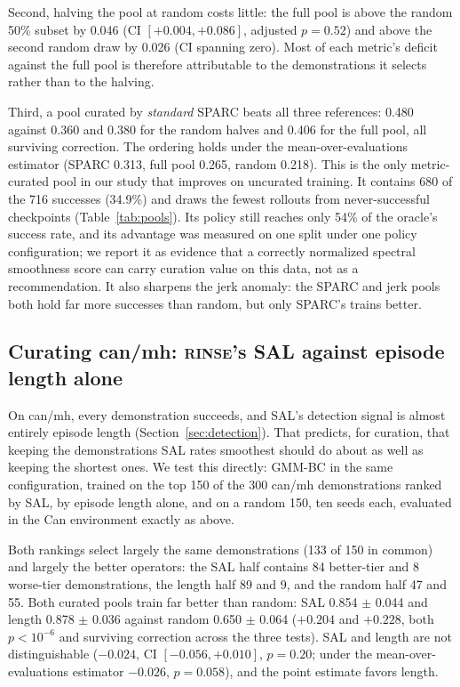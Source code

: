 \documentclass[10pt]{article}
\newcommand{\rinse}{\textmd{\textsc{rinse}}}
\begin{document}
Second, halving the pool at random costs little: the full pool is above the
random 50\% subset by 0.046 (CI $[+0.004, +0.086]$, adjusted $p = 0.52$) and
above the second random draw by 0.026 (CI spanning zero). Most of each
metric's deficit against the full pool is therefore attributable to the
demonstrations it selects rather than to the halving.

Third, a pool curated by \emph{standard} SPARC beats all three references:
0.480 against 0.360 and 0.380 for the random halves and 0.406 for the full
pool, all surviving correction. The ordering holds under the
mean-over-evaluations estimator (SPARC 0.313, full pool 0.265, random
0.218). This is the only metric-curated pool in our study that improves on
uncurated training. It contains 680 of the 716 successes (34.9\%) and draws
the fewest rollouts from never-successful checkpoints
(Table~\ref{tab:pools}). Its policy still reaches only 54\% of the oracle's
success rate, and its advantage was measured on one split under one policy
configuration; we report it as evidence that a correctly normalized
spectral smoothness score can carry curation value on this data, not as a
recommendation. It also sharpens the jerk anomaly: the SPARC and jerk pools
both hold far more successes than random, but only SPARC's trains better.

\subsection{Curating can/mh: \rinse{}'s SAL against episode length alone}
\label{sec:mhtrain}

On can/mh, every demonstration succeeds, and SAL's detection signal is
almost entirely episode length (Section~\ref{sec:detection}). That
predicts, for curation, that keeping the demonstrations SAL rates
smoothest should do about as well as keeping the shortest ones. We test this
directly: GMM-BC in the same configuration, trained on the top 150 of the
300 can/mh demonstrations ranked by SAL, by episode length alone, and on a
random 150, ten seeds each, evaluated in the Can environment exactly as
above.

Both rankings select largely the same demonstrations (133 of 150 in
common) and largely the better operators: the SAL half contains 84
better-tier and 8 worse-tier demonstrations, the length half 89 and 9, and
the random half 47 and 55. Both curated pools train far better than random:
SAL 0.854 $\pm$ 0.044 and length 0.878 $\pm$ 0.036 against random 0.650
$\pm$ 0.064 ($+0.204$ and $+0.228$, both $p < 10^{-6}$ and surviving
correction across the three tests). SAL and length are not distinguishable
($-0.024$, CI $[-0.056, +0.010]$, $p = 0.20$; under the
mean-over-evaluations estimator $-0.026$, $p = 0.058$), and the point
estimate favors length.
\end{document}
